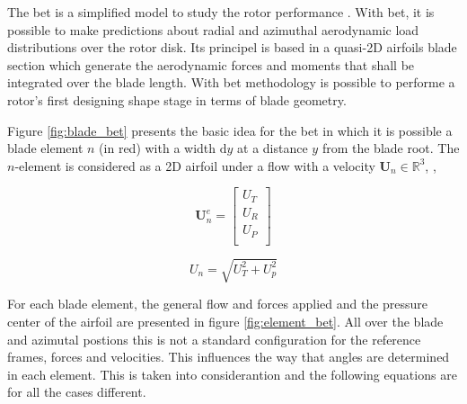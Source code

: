 The \gls{bet} is a simplified model to study the rotor performance \cite{leishman_principles_2006}. With \gls{bet}, it is possible to make predictions about radial and azimuthal aerodynamic load distributions over the rotor disk. Its principel is based in a quasi-2D airfoils blade section which generate the aerodynamic forces and moments that shall be integrated over the blade length. With \gls{bet} methodology is possible to performe a rotor's first designing shape stage in terms of blade geometry.

Figure \ref{fig:blade_bet} presents the basic idea for the \gls{bet} in which it is possible a blade element $n$ (in red) with a width $\mathrm{d}y$ at a distance $y$ from the blade root. The $n$-element is considered as a 2D airfoil under a flow with a velocity $\mathbf{U}_n \in \mathbb{R}^3$, ,

\begin{equation}
    \mathbf{U}_n^e = 
    \begin{bmatrix}
        U_T \\
        U_R \\
        U_P \\
    \end{bmatrix}
    \label{eq:velocity_vector_in_element}
\end{equation}


\begin{equation}
    U_n = \sqrt{U_T^2 + U_p^2}
\end{equation}


For each blade element, the general flow and forces applied and the pressure center of the airfoil are presented in figure \ref{fig:element_bet}. All over the blade and azimutal postions this is not a standard configuration for the reference frames, forces and velocities. This influences the way that angles are determined in each element. This is taken into considerantion and the following equations are for all the cases different.


